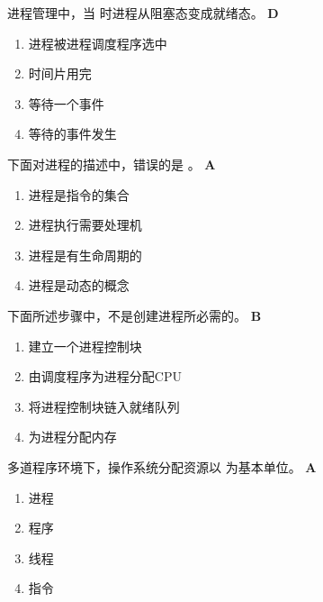 \begin{problem}
	进程管理中，当 \myline 时进程从阻塞态变成就绪态。
	\textbf{D}
	\vspace{-0.5em}
	\begin{multicols}{2}
		\begin{enumerate}[label=\Alph*.]
			\item 进程被进程调度程序选中
			\item 时间片用完
			\item 等待一个事件
			\item 等待的事件发生
		\end{enumerate}
	\end{multicols}
	\vspace{-1em}
\end{problem}


\begin{problem}
	下面对进程的描述中，错误的是 \myline。
	\textbf{A}
	\vspace{-0.5em}
	\begin{multicols}{2}
		\begin{enumerate}[label=\Alph*.]
			\item 进程是指令的集合
			\item 进程执行需要处理机
			\item 进程是有生命周期的
			\item 进程是动态的概念
		\end{enumerate}
	\end{multicols}
	\vspace{-1em}
\end{problem}


\begin{problem}
	下面所述步骤中，\myline 不是创建进程所必需的。
	\textbf{B}
	\vspace{-0.5em}
	\begin{multicols}{2}
		\begin{enumerate}[label=\Alph*.]
			\item 建立一个进程控制块
			\item 由调度程序为进程分配CPU
			\item 将进程控制块链入就绪队列
			\item 为进程分配内存
		\end{enumerate}
	\end{multicols}
	\vspace{-1em}
\end{problem}


\begin{problem}
	多道程序环境下，操作系统分配资源以 \myline 为基本单位。
	\textbf{A}
	\vspace{-0.5em}
	\begin{multicols}{4}
		\begin{enumerate}[label=\Alph*.]
			\item 进程
			\item 程序
			\item 线程
			\item 指令
		\end{enumerate}
	\end{multicols}
	\vspace{-1em}
\end{problem}


